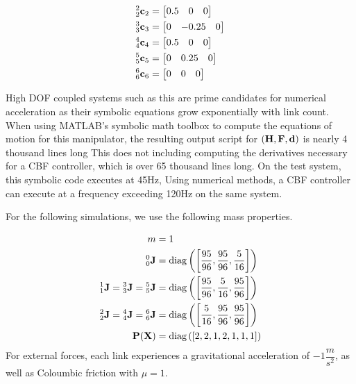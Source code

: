 \begin{align*}
\begin{split}
        {^2_2 \mathbf{c}_2} &= \begin{bmatrix} 0.5& 0& 0 \end{bmatrix}\\
        {^3_3 \mathbf{c} _3} &= \begin{bmatrix} 0& -0.25& 0\end{bmatrix}\\
        {^4_4 \mathbf{c} _4} &= \begin{bmatrix} 0.5& 0& 0 \end{bmatrix}\\
        {^5_5 \mathbf{c} _5} &= \begin{bmatrix} 0 & 0.25 & 0\end{bmatrix}\\
        {^6_6 \mathbf{c} _6} &= \begin{bmatrix} 0 & 0 & 0\end{bmatrix}\\
    \end{split}
\end{align*}

High DOF coupled systems such as this are prime candidates for numerical acceleration as their symbolic equations grow exponentially with link count. When using MATLAB's symbolic math toolbox to compute the equations of motion for this manipulator, the resulting output script for $({\mathbf{H}}, {\mathbf{F}}, {\mathbf{d}})$ is nearly 4 thousand lines long This does not including computing the derivatives necessary for a CBF controller, which is over 65 thousand lines long. On the test system, this symbolic code executes at 45Hz,  Using numerical methods, a CBF controller can execute at a frequency exceeding 120Hz on the same system. \newline

\noindent For the following simulations, we use the following mass properties.

\begin{align*}
    m &= 1\\
    {^0_0}\mathbf{J} &=  \text{diag}\left (\left [\dfrac{95}{96}, \dfrac{95}{96},  \dfrac{5}{16} \right ] \right )\\
    {^1_1}\mathbf{J} = {^3_3}\mathbf{J} = {^5_5}\mathbf{J} &=  \text{diag}\left (\left [ \dfrac{95}{96}, \dfrac{5}{16}, \dfrac{95}{96} \right ]\right ) \\
    {^2_2}\mathbf{J} = {^4_4}\mathbf{J} = {^6_6}\mathbf{J} &=  \text{diag}\left (\left [ \dfrac{5}{16}, \dfrac{95}{96}, \dfrac{95}{96} \right ]\right ) \\
    \mathbf{P}(\mathbf{X}) &= \text{diag} \left (\left [2, 2, 1, 2, 1, 1, 1 \right] \right )
\end{align*}
\noindent For external forces,  each link experiences a gravitational acceleration of $-1 \dfrac{m}{s^2}$, as well as Coloumbic friction with $\mu = 1$. \newline

